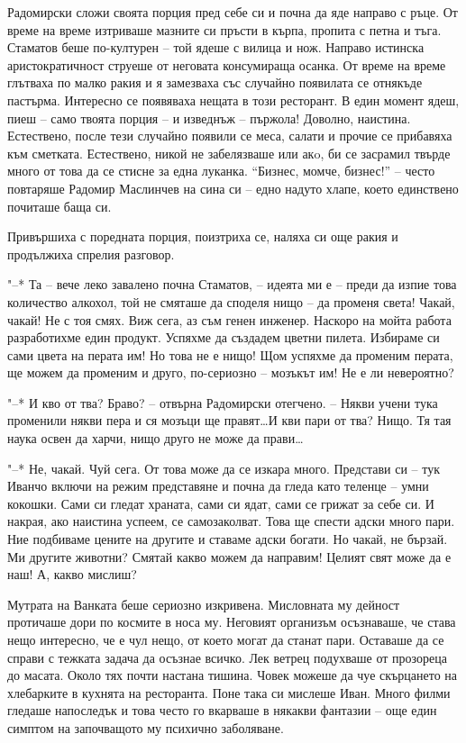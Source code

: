 \documentclass[ebook,openany,12pt]{memoir}
\begin{document}
Радомирски сложи своята порция пред себе си и почна да яде направо с ръце. От време на време изтриваше мазните си пръсти в кърпа, пропита с петна и тъга. Стаматов беше по-културен – той ядеше с вилица и нож. Направо истинска аристократичност струеше от неговата консумираща осанка. От време на време глътваха по малко ракия и я замезваха със случайно появилата се отнякъде пастърма. Интересно се появяваха нещата в този ресторант. В един момент ядеш, пиеш – само твоята порция -- и изведнъж – пържола! Доволно, наистина. Естествено, после тези случайно появили се меса, салати и прочие се прибавяха към сметката. Естествено, никой не забелязваше или акo, би се засрамил твърде много от това да се стисне за една луканка. ``Бизнес, момче, бизнес!'' -- често повтаряше Радомир Маслинчев на сина си – едно надуто хлапе, което единствено почиташе баща си.

Привършиха с поредната порция, поизтриха се, наляха си още ракия и продължиха спрелия разговор.

"--* Та -- вече леко завалено почна Стаматов, – идеята ми е – преди да изпие това количество алкохол, той не смяташе да споделя нищо – да променя света! Чакай, чакай! Не с тоя смях. Виж сега, аз съм генен инженер. Наскоро на мойта работа разработихме един продукт. Успяхме да създадем цветни пилета. Избираме си сами цвета на перата им! Но това не е нищо! Щом успяхме да променим перата, ще можем да променим и друго, по-сериозно – мозъкът им! Не е ли невероятно?

"--* И кво от тва? Браво? – отвърна Радомирски отегчено. – Някви учени тука променили някви пера и ся мозъци ще правят\ldots И кви пари от тва? Нищо. Тя тая наука освен да харчи, нищо друго не може да прави\ldots 

"--* Не, чакай. Чуй сега. От това може да се изкара много. Представи си – тук Иванчо включи на режим представяне и почна да гледа като теленце – умни кокошки. Сами си гледат храната, сами си ядат, сами се грижат за себе си. И накрая, ако наистина успеем, се самозаколват. Това ще спести адски много пари. Ние подбиваме цените на другите и ставаме адски богати. Но чакай, не бързай. Ми другите животни? Смятай какво можем да направим! Целият свят може да е наш! А, какво мислиш?

Мутрата на Ванката беше сериозно изкривена. Мисловната му дейност протичаше дори по космите в носа му. Неговият организъм осъзнаваше, че става нещо интересно, че е чул нещо, от което могат да станат пари. Оставаше да се справи с тежката задача да осъзнае всичко. Лек ветрец подухваше от прозореца до масата. Около тях почти настана тишина. Човек можеше да чуе скърцането на хлебарките в кухнята на ресторанта. Поне така си мислеше Иван. Много филми гледаше напоследък и това често го вкарваше в някакви фантазии – още един симптом на започващото му психично заболяване.
\end{document}
